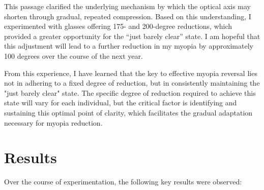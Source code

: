 \documentclass[12pt]{article}
\begin{document}
This passage clarified the underlying mechanism by which the optical axis may shorten through gradual, repeated compression. Based on this understanding, I experimented with glasses offering 175- and 200-degree reductions, which provided a greater opportunity for the “just barely clear” state. I am hopeful that this adjustment will lead to a further reduction in my myopia by approximately 100 degrees over the course of the next year.

From this experience, I have learned that the key to effective myopia reversal lies not in adhering to a fixed degree of reduction, but in consistently maintaining the "just barely clear" state. The specific degree of reduction required to achieve this state will vary for each individual, but the critical factor is identifying and sustaining this optimal point of clarity, which facilitates the gradual adaptation necessary for myopia reduction.

\section{Results}
Over the course of experimentation, the following key results were observed:
\end{document}
